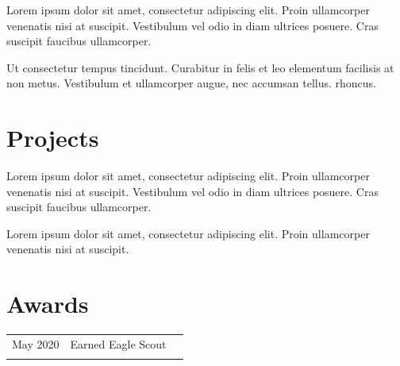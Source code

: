 \documentclass[]{latex/resume}
\begin{document}
\begin{minipage}[t]{0.70\textwidth}
    \sectionsep

    \begin{tightemize}
        \sectionsep
            \item Lorem ipsum dolor sit amet, consectetur adipiscing elit. Proin ullamcorper venenatis nisi at suscipit. Vestibulum vel odio in diam ultrices posuere. Cras suscipit faucibus ullamcorper.
            \item Ut consectetur tempus tincidunt. Curabitur in felis et leo elementum facilisis at non metus. Vestibulum et ullamcorper augue, nec accumsan tellus.
            rhoncus.
        \end{tightemize}

    \sectionsep



\section{Projects}

     
    \begin{tightemize}
        \item Lorem ipsum dolor sit amet, consectetur adipiscing elit. Proin ullamcorper venenatis nisi at suscipit. Vestibulum vel odio in diam ultrices posuere. Cras suscipit faucibus ullamcorper.
        \item Lorem ipsum dolor sit amet, consectetur adipiscing elit. Proin ullamcorper venenatis nisi at suscipit.
    \end{tightemize}

    \sectionsep




\section{Awards} 
    \begin{tabular}{rll}
        May 2020 & Earned Eagle Scout \\
        \\
    \end{tabular}
    \sectionsep
%
%

\end{minipage} 
\end{document}
